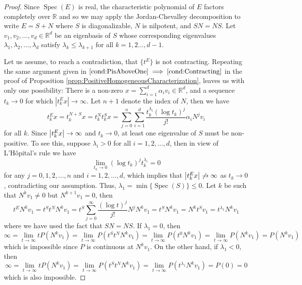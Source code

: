 \documentclass[11pt]{article}
\newcommand\Spec{\operatorname{Spec}}
\newcommand\R{\mathbb{R}}
\newcommand{\f}[2]{\frac{#1}{#2}}
\begin{document}
\begin{proof}
Since $\Spec(E)$ is real, the characteristic polynomial of $E$ factors completely over $\R$ and so we may apply the Jordan-Chevalley decomposition to write $E=S+N$ where $S$ is diagonalizable, $N$ is nilpotent, and $SN=NS$. Let $v_1,v_2,\dots,v_d \in \R^d$ be an eigenbasis of $S$ whose corresponding eigenvalues $\lambda_1,\lambda_2,\dots,\lambda_d$ satisfy $\lambda_k\leq \lambda_{k+1}$ for all $k=1,2\dots,d-1$.

Let us assume, to reach a contradiction, 
that $\{ t^E \}$ is not contracting. Repeating the same argument given in $\ref{cond:PisAboveOne}\implies\ref{cond:Contracting}$ in the proof of Proposition \ref{prop:PositiveHomogeneousCharacterization}, leaves us with only one possibility: There is a non-zero $x = \sum^d_{i=1}\alpha_i v_i \in\mathbb{R}^d$, and a sequence $t_k\to 0$ for which $|t_k^E x|\to\infty$. Let $n+1$ denote the index of $N$, then we have
\begin{equation*}
t^E_k x = t_k^{N+S} x 
= t_k^N t_k^S x 
= \sum_{j=0}^n\sum_{i=1}^d \f{t_k^{\lambda_i}(\log t_k)^j}{j!}   \alpha_iN^j v_i
\end{equation*}
for all $k$. Since $\abs{t_k^E x} \to \infty$ and $t_k \to 0$, at least one eigenvalue of $S$ must be non-positive. To see this, suppose $\lambda_i > 0$ for all $i = 1,2,\dots,d$, then in view of L'H\^{o}pital's rule we have
\begin{equation*}
    \lim_{t_k \to 0}(\log t_k)^j t_k^{\lambda_i} = 0  
\end{equation*}
for any $j =0, 1,2,\dots,n$ and $i =1,2,\dots,d$, which implies that $\abs{t^E_k x} \not\to \infty$ as $t_k \to 0$, contradicting our assumption. Thus, $\lambda_1 = \min\{ \Spec(S)\} \leq 0$. Let $k$ be such that $N^k v_1 \neq 0$ but $N^{k+1} v_1 = 0$, then
\begin{equation*}
    t^E N^k v_1 = t^S t^N N^k v_1 = t^S \sum_{j=0}^\infty \f{(\log t)^j}{j!}N^j N^k v_1 = t^S N^k v_1 = N^k t^S  v_1 =  t^{\lambda_{1}} N^k  v_1
\end{equation*}
where we have used the fact that $SN = NS$. If $\lambda_1= 0$, then 
\begin{equation*}
    \infty =  \lim_{t\to \infty} tP(N^k v_1)  = \lim_{t\to \infty} P( t^S t^N N^k v_1) =  \lim_{t\to \infty}P(t^{0} N^k v_1)= \lim_{t\to \infty}P( N^k v_1) = P(N^k v_1)
\end{equation*}
which is impossible since $P$ is continuous at $N^k v_1$. On the other hand, if $\lambda_1 < 0$, then
\begin{equation*}
    \infty = \lim_{t\to \infty} tP(N^k v_1) = \lim_{t\to \infty} P(t^S t^N N^k v_1) = \lim_{t\to \infty}P(t^{\lambda_1} N^k v_1) = P(0) = 0
\end{equation*}
which is also impossible. 
\end{proof}
\end{document}
